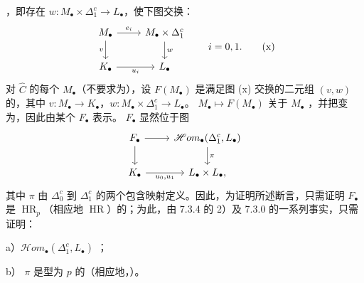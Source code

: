，即存在 $w:M_\bullet\times\Delta_1^c\to L_\bullet$，使下图交换：
\[\begin{tikzcd}M_\bullet\arrow[r,"e_i"]\arrow[d,"v"']&M_\bullet\times\Delta_1^c\arrow[d,"w"]\\
K_\bullet\arrow[r,"u_i"']&L_\bullet\end{tikzcd}\qquad i=0,1.\tag{x}\]
对 $\widehat C$ 的每个 $M_\bullet$（不要求为），设 $F(M_\bullet)$ 是满足图 (x) 交换的二元组 $(v,w)$ 的，其中 $v:M_\bullet\to K_\bullet$，$w:M_\bullet\times\Delta_1^c\to L_\bullet$。 $M_\bullet\mapsto F(M_\bullet)$ 关于 $M_\bullet$ ，并把变为，因此由某个 $F_\bullet$ 表示。 $F_\bullet$ 显然位于图
\[\begin{tikzcd}F_\bullet\arrow[r]\arrow[d]&\mathscr Hom_\bullet(\Delta_1^c,L_\bullet)\arrow[d,"\pi"]\\
K_\bullet\arrow[r,"{u_0,u_1}"']&L_\bullet\times L_\bullet,
\end{tikzcd}\]
其中 $\pi$ 由 $\Delta_0^c$ 到 $\Delta_1^c$ 的两个包含映射定义。因此，为证明所述断言，只需证明 $F_\bullet$ 是 $\operatorname{HR}_p$（相应地 $\operatorname{HR}$）的；为此，由 7.3.4 的 2）及 7.3.0 的一系列事实，只需证明：

a）$\mathscr Hom_\bullet(\Delta_1^c,L_\bullet)$ ；

b） $\pi$ 是型为 $p$ 的（相应地，）。

